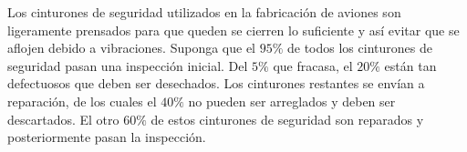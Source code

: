 \addpoints

\question[20] Los cinturones de seguridad utilizados en la fabricación de aviones son ligeramente prensados 
 para que queden se cierren lo suficiente y así evitar que se aflojen debido a vibraciones. Suponga que el $95\%$ de todos los cinturones de seguridad pasan una inspección inicial. Del $5\%$ que fracasa, el $20\%$ están tan defectuosos que deben ser desechados. Los cinturones restantes se envían a reparación, de los cuales el $40\%$ no pueden ser arreglados y deben ser descartados. El otro $60\%$ de estos cinturones de seguridad son reparados y posteriormente pasan la inspección.
\noaddpoints


